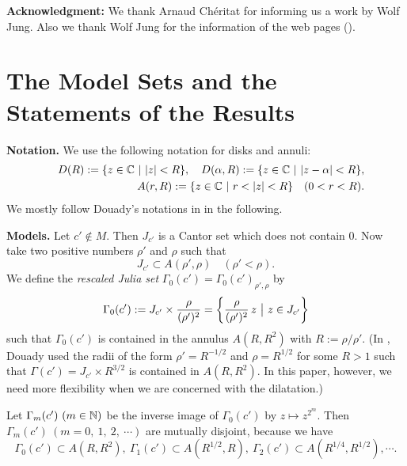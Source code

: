 \noin
{\bf Acknowledgment: } 
We thank Arnaud Ch\'eritat for informing us a work by Wolf Jung. Also we thank 
Wolf Jung for the information of the web pages (\cite{Jung 2015}).










\section{The Model Sets and the Statements of the Results}

\noin
{\bf Notation.} 
We use the following notation for disks and annuli:
\begin{eqnarray*}
& &  D(R) := \{ z \in \mathbb C \ | \ |z| < R \}, \quad
  D(\alpha, R) := \{ z \in \mathbb C \ | \ |z-\alpha| < R \}, \\
& & A(r, R) := \{ z \in \mathbb C \ | \ r < |z| < R \} \quad (0 < r < R).
\end{eqnarray*}
We mostly follow Douady's notations in \cite{Douady 2000} in the 
following. 

\noin
{\bf Models.}
Let $c' \notin M$. Then $J_{c'}$ is a Cantor set which does not contain $0$. 
Now take two positive numbers $\rho'$ and $\rho$ such that 
$$
J_{c'} 
\subset 
A(\rho', \rho) \quad (\rho' < \rho). 
$$
We define 
the {\it rescaled Julia set}
$\Gamma_0(c')=\Gamma_0(c')_{\rho',\rho}$
by
$$
\Gamma_0(c') 
:= 
J_{c'} \times \frac{\rho}{(\rho')^2}
=
{\left\{  \frac{\rho}{(\rho')^2} \,z \ \big| \ z \in J_{c'}  \right\}}
$$ 
such that 
$\Gamma_0(c')$ 
is contained in the annulus 
$A(R, R^2)$ with $R:=\rho/\rho'$. 
(In \cite{Douady 2000}, Douady used the radii of the form 
$\rho'=R^{-1/2}$ and $\rho=R^{1/2}$ for some $R>1$ 
such that $\Gamma(c')=J_{c'} \times R^{3/2}$
is contained in $A(R, R^2)$. 
In this paper, however, we need more flexibility
when we are concerned with the dilatation.)

Let $\Gamma_m(c') \ (m \in \mathbb N)$ be the inverse image of $\Gamma_0(c')$ by 
$z \mapsto z^{2^m}$. Then $\Gamma_m(c') \ (m=0, \ 1, \ 2, \ \cdots)$ 
are mutually disjoint, because we have
$$
\Gamma_0(c') \subset A(R, R^2), \
\Gamma_1(c') \subset A(R^{1/2}, R), \
\Gamma_2(c') \subset A(R^{1/4}, R^{1/2}), \cdots.
$$


